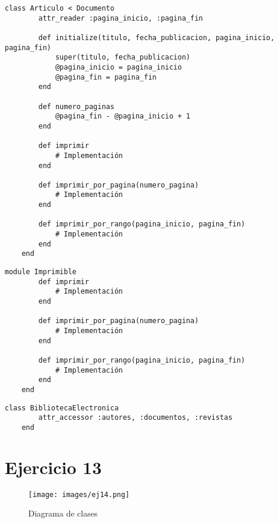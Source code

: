 \documentclass[a4paper,12pt]{article}
\begin{document}
\begin{lstlisting}[style=customrb, caption={Clase Articulo (cabecera, atributos y cabeceras de los métodos), constructor de la clase Artículo}]
    class Articulo < Documento
        attr_reader :pagina_inicio, :pagina_fin

        def initialize(titulo, fecha_publicacion, pagina_inicio, pagina_fin)
            super(titulo, fecha_publicacion)
            @pagina_inicio = pagina_inicio
            @pagina_fin = pagina_fin
        end

        def numero_paginas
            @pagina_fin - @pagina_inicio + 1
        end

        def imprimir
            # Implementación
        end

        def imprimir_por_pagina(numero_pagina)
            # Implementación
        end

        def imprimir_por_rango(pagina_inicio, pagina_fin)
            # Implementación
        end
    end
\end{lstlisting}

\begin{lstlisting}[style=customrb, caption={Interfaz Imprimible}]
    module Imprimible
        def imprimir
            # Implementación
        end

        def imprimir_por_pagina(numero_pagina)
            # Implementación
        end

        def imprimir_por_rango(pagina_inicio, pagina_fin)
            # Implementación
        end
    end
\end{lstlisting}

\begin{lstlisting}[style=customrb, caption={Atributos que definen el estado de la clase BibliotecaElectronica}]
    class BibliotecaElectronica
        attr_accessor :autores, :documentos, :revistas
    end
\end{lstlisting}





\section{Ejercicio 13}

\begin{figure}[H]
    \centering
    \texttt{[image: images/ej14.png]}
    \caption{Diagrama de clases}
    \label{fig:ejercicio14}
\end{figure}
\end{document}
